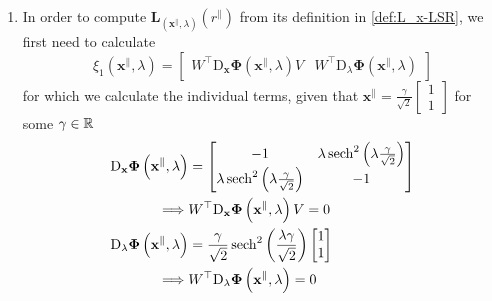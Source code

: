 \documentclass[letterpaper, 10 pt, conference, dvipsnames]{ieeeconf}
\begin{document}
\begin{enumerate}
\begin{align*}
                                   & = \norm{\begin{bmatrix}-2\end{bmatrix}^{-1}} = \boxed{\frac12}
          \end{align*}
    \item In order to compute \(\mathbf{L}_{(\mathbf{x}^\parallel,\lambda)}(r^\parallel)\) from its definition in \eqref{def:L_x-LSR}, we first need to calculate
          \begin{equation*}
              \xi_1(\mathbf{x}^{\parallel},\lambda) = \begin{bmatrix}W^\top\mathrm{D}_{\mathbf{x}}\boldsymbol{\Phi}(\mathbf{x}^{\parallel},\lambda)V&W^\top\mathrm{D}_{\lambda}\boldsymbol{\Phi}(\mathbf{x}^{\parallel},\lambda)\end{bmatrix}
          \end{equation*}
          for which we calculate the individual terms, given that \(\displaystyle\mathbf{x}^{\parallel} = \frac{\gamma}{\sqrt{2}}\begin{bmatrix}1\\1\end{bmatrix}\) for some \(\gamma\in\mathbb{R}^{}\)
          \begin{align*}
              \mathrm{D}_{\mathbf{x}}\boldsymbol{\Phi}\left(\mathbf{x}^{\parallel},\lambda\right) & = \begin{bmatrix}-1&\lambda\sech^2\left(\lambda\frac{\gamma}{\sqrt{2}}\right)\\\lambda\sech^2\left(\lambda\frac{\gamma}{\sqrt{2}}\right)&-1\end{bmatrix} \\
              \implies                                                                            & W^\top\mathrm{D}_{\mathbf{x}}\boldsymbol{\Phi}\left(\mathbf{x}^{\parallel},\lambda\right)V = 0                                                                                                                         \\
              \mathrm{D}_{\lambda}\boldsymbol{\Phi}\left(\mathbf{x}^{\parallel},\lambda\right)    & = \frac{\gamma}{\sqrt{2}}\sech^2\left(\frac{\lambda\gamma}{\sqrt{2}}\right)\begin{bmatrix}1\\1\end{bmatrix}                                                                                                            \\
              \implies                                                                            & W^\top\mathrm{D}_{\lambda}\boldsymbol{\Phi}\left(\mathbf{x}^{\parallel},\lambda\right) = 0

\end{align*}
\end{enumerate}
\end{document}
